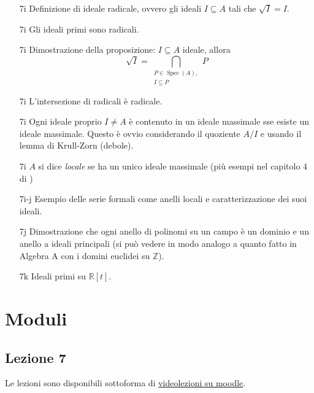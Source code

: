 \documentclass[italian]{article}
\begin{document}
    \begin{enumerate}
      \item[7i] Definizione di ideale radicale, ovvero gli ideali $I \subseteq
        A$ tali che $\sqrt{I} = I$.
      \item[7i] Gli ideali primi sono radicali.
      \item[7i] Dimostrazione della proposizione: $I \subseteq A$ ideale, allora 
        \begin{equation*}
          \sqrt{I} = \bigcap_{\substack{P \in \operatorname{Spec}(A),\\ I \subseteq P}} P
        \end{equation*}
      \item[7i] L'intersezione di radicali è radicale. 
      \item[7i] Ogni ideale proprio $I \neq A$ è contenuto in un ideale
        massimale sse esiste un ideale massimale. Questo è ovvio considerando il 
        quoziente $A/I$ e usando il lemma di Krull-Zorn (debole).
      \item[7i] $A$ si dice \emph{locale} se ha un unico ideale massimale
        (più esempi nel capitolo 4 di \cite{vergura})
      \item[7i-j] Esempio delle serie formali come anelli locali
        e caratterizzazione dei suoi ideali. 
      \item[7j] Dimostrazione che ogni anello di polinomi su un campo è un dominio 
        e un anello a ideali principali (si può vedere in modo analogo a quanto 
        fatto in Algebra A con i domini euclidei su $\mathbb{Z}$). 
      \item[7k] Ideali primi su $\mathbb{R}\left[ t \right]$. 
    \end{enumerate}
    
    \section{Moduli}
    
    \subsection{Lezione 7}

    Le lezioni sono disponibili sottoforma di 
    \href{https://didatticaonline.unitn.it/dol/course/view.php?id=23268}{videolezioni
    su moodle}.
    
\end{document}
